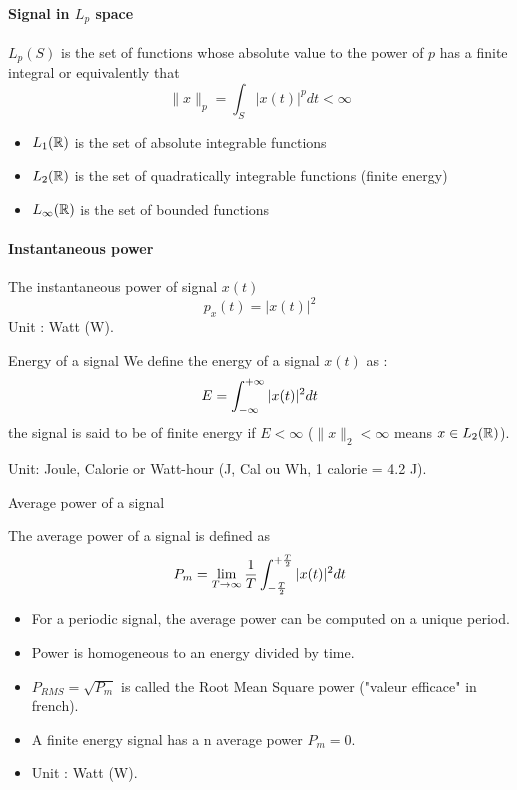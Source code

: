 \paragraph{Signal in $L_p$ space}
$L_p(S)$ is the set of functions whose absolute value to the power of $p$
has a finite integral or equivalently that
\begin{equation}
  \|x\|_p=\int_S |x(t)|^p dt < \infty
  \label{eq:lp_space}
\end{equation}
\begin{itemize}
  \item $L_1(\mathbb{R})$ is the set of absolute integrable functions
  \item $L_2(\mathbb{R})$ is the set of quadratically integrable functions (finite energy)
  \item $L_\infty(\mathbb{R})$ is the set of bounded functions
\end{itemize}

\paragraph{Instantaneous power}
The instantaneous power of signal $x(t)$ 
\begin{equation}
  \label{eq:puissinst}
  p_x(t)=|x(t)|^2
\end{equation}
 Unit :  Watt (W).


 \begin{block}{Energy of a signal}
  We define the energy of a signal $x(t)$ as :
\begin{equation}
\label{eq:enerfinie}
E= \int_{-\infty}^{+\infty}|x(t)|^2dt
\end{equation}
the signal is said to be of finite energy if $E<\infty$ ($\|x\|_2<\infty$ means $x\in L_2(\mathbb{R})$).

Unit: Joule, Calorie or Watt-hour (J, Cal ou Wh, 1 calorie = 4.2 J).
\end{block}

\begin{block}{Average power of a signal}
  
  The average power of a signal is defined as
   \begin{equation}
     \label{eq:puissance}
    P_m= \lim_{T\rightarrow\infty} \frac{1}{T}\int_{-\frac{T}{2}}^{+\frac{T}{2}}|x(t)|^2dt
   \end{equation}
   \begin{itemize}
   \item For a periodic signal, the average power can be computed on a unique period.
   \item Power is homogeneous to an energy divided by time.
   \item $P_{RMS}=\sqrt{P_m}$ is called the Root Mean Square power ("valeur efficace" in french).
   \item A finite energy signal has a n average power $P_m=0$.
   \item  Unit :  Watt (W).
   \end{itemize}
   
     \end{block}


